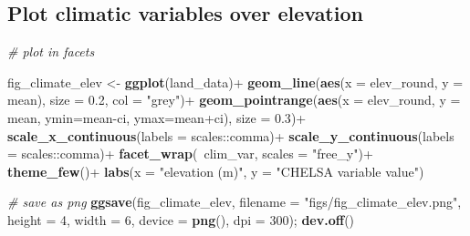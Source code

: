 \documentclass[]{article}
\newenvironment{Shaded}{}{}
\newcommand{\CommentTok}[1]{\textcolor[rgb]{0.38,0.63,0.69}{\textit{#1}}}
\newcommand{\DataTypeTok}[1]{\textcolor[rgb]{0.56,0.13,0.00}{#1}}
\newcommand{\DecValTok}[1]{\textcolor[rgb]{0.25,0.63,0.44}{#1}}
\newcommand{\FloatTok}[1]{\textcolor[rgb]{0.25,0.63,0.44}{#1}}
\newcommand{\KeywordTok}[1]{\textcolor[rgb]{0.00,0.44,0.13}{\textbf{#1}}}
\newcommand{\NormalTok}[1]{#1}
\newcommand{\OperatorTok}[1]{\textcolor[rgb]{0.40,0.40,0.40}{#1}}
\newcommand{\StringTok}[1]{\textcolor[rgb]{0.25,0.44,0.63}{#1}}
\begin{document}
\hypertarget{plot-climatic-variables-over-elevation}{%
\subsection{Plot climatic variables over elevation}\label{plot-climatic-variables-over-elevation}}

\begin{Shaded}
\begin{Highlighting}[]
\CommentTok{# plot in facets}

\NormalTok{fig_climate_elev <-}\StringTok{ }\KeywordTok{ggplot}\NormalTok{(land_data)}\OperatorTok{+}
\StringTok{  }\KeywordTok{geom_line}\NormalTok{(}\KeywordTok{aes}\NormalTok{(}\DataTypeTok{x =}\NormalTok{ elev_round, }\DataTypeTok{y =}\NormalTok{ mean),}
            \DataTypeTok{size =} \FloatTok{0.2}\NormalTok{, }\DataTypeTok{col =} \StringTok{"grey"}\NormalTok{)}\OperatorTok{+}
\StringTok{  }\KeywordTok{geom_pointrange}\NormalTok{(}\KeywordTok{aes}\NormalTok{(}\DataTypeTok{x =}\NormalTok{ elev_round, }\DataTypeTok{y =}\NormalTok{ mean, }\DataTypeTok{ymin=}\NormalTok{mean}\OperatorTok{-}\NormalTok{ci, }\DataTypeTok{ymax=}\NormalTok{mean}\OperatorTok{+}\NormalTok{ci),}
                  \DataTypeTok{size =} \FloatTok{0.3}\NormalTok{)}\OperatorTok{+}
\StringTok{  }\KeywordTok{scale_x_continuous}\NormalTok{(}\DataTypeTok{labels =}\NormalTok{ scales}\OperatorTok{::}\NormalTok{comma)}\OperatorTok{+}
\StringTok{  }\KeywordTok{scale_y_continuous}\NormalTok{(}\DataTypeTok{labels =}\NormalTok{ scales}\OperatorTok{::}\NormalTok{comma)}\OperatorTok{+}
\StringTok{  }\KeywordTok{facet_wrap}\NormalTok{(}\OperatorTok{~}\NormalTok{clim_var, }\DataTypeTok{scales =} \StringTok{"free_y"}\NormalTok{)}\OperatorTok{+}
\StringTok{  }\KeywordTok{theme_few}\NormalTok{()}\OperatorTok{+}
\StringTok{  }\KeywordTok{labs}\NormalTok{(}\DataTypeTok{x =} \StringTok{"elevation (m)"}\NormalTok{, }\DataTypeTok{y =} \StringTok{"CHELSA variable value"}\NormalTok{)}

\CommentTok{# save as png}
\KeywordTok{ggsave}\NormalTok{(fig_climate_elev, }\DataTypeTok{filename =} \StringTok{"figs/fig_climate_elev.png"}\NormalTok{, }
       \DataTypeTok{height =} \DecValTok{4}\NormalTok{, }\DataTypeTok{width =} \DecValTok{6}\NormalTok{, }\DataTypeTok{device =} \KeywordTok{png}\NormalTok{(), }\DataTypeTok{dpi =} \DecValTok{300}\NormalTok{); }\KeywordTok{dev.off}\NormalTok{()}
\end{Highlighting}
\end{Shaded}
\end{document}
